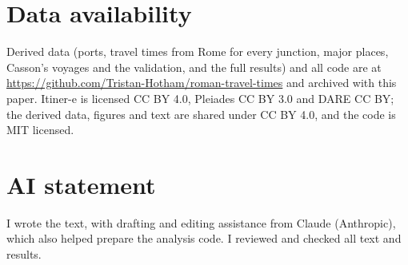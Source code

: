 \documentclass[11pt,a4paper]{article}
\begin{document}
\section*{Data availability}
Derived data (ports, travel times from Rome for every junction, major places, Casson's voyages and the validation, and the full results) and all code are at \url{https://github.com/Tristan-Hotham/roman-travel-times} and archived with this paper. Itiner-e is licensed CC BY 4.0, Pleiades CC BY 3.0 and DARE CC BY; the derived data, figures and text are shared under CC BY 4.0, and the code is MIT licensed.

\section*{AI statement}
I wrote the text, with drafting and editing assistance from Claude (Anthropic), which also helped prepare the analysis code. I reviewed and checked all text and results.
\end{document}
